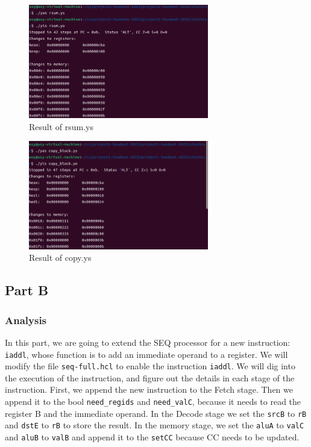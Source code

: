 \documentclass{article}
\begin{document}
\begin{figure}[htbp]
\centering
\includegraphics[width=0.7\textwidth]{figure/ptaysum.png}
\caption{Result of rsum.ys} %
\label{fig:rsum} %
\end{figure}

\begin{figure}[htbp]
\centering
\includegraphics[width=0.7\textwidth]{figure/ptacblock.png}
\caption{Result of copy.ys} %
\label{fig:copy} %
\end{figure} 

\subsection{Part B}

\subsubsection{Analysis}

In this part, we are going to extend the SEQ processor for a new instruction: \verb |iaddl|, whose function is to add an immediate operand to a register. We will modify the file \verb |seq-full.hcl| to enable the instruction \verb|iaddl|. We will dig into the execution of the instruction, and figure out the details in each stage of the instruction. First, we append the new instruction to the Fetch stage. Then we append it to the bool \verb |need_regids| and \verb |need_valC|, because it needs to read the register B and the immediate operand. In the Decode stage we set the \verb |srcB| to \verb |rB| and \verb |dstE| to \verb |rB| to store the result. In the memory stage, we set the \verb |aluA| to \verb |valC| and \verb |aluB| to \verb |valB| and append it to the \verb |setCC| because CC needs to be updated.
\end{document}
